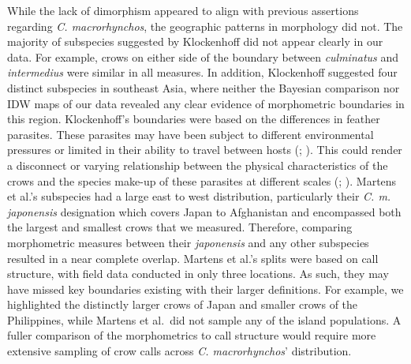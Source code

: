 \documentclass[10pt,a4paper]{article}
\begin{document}
While the lack of dimorphism appeared to align with previous assertions regarding \emph{C. macrorhynchos}, the geographic patterns in morphology did not.
The majority of subspecies suggested by Klockenhoff did not appear clearly in our data.
For example, crows on either side of the boundary between \emph{culminatus} and \emph{intermedius} were similar in all measures.
In addition, Klockenhoff suggested four distinct subspecies in southeast Asia, where neither the Bayesian comparison nor IDW maps of our data revealed any clear evidence of morphometric boundaries in this region.
Klockenhoff's boundaries were based on the differences in feather parasites.
These parasites may have been subject to different environmental pressures or limited in their ability to travel between hosts (; ).
This could render a disconnect or varying relationship between the physical characteristics of the crows and the species make-up of these parasites at different scales (; ).
Martens et al.'s subspecies had a large east to west distribution, particularly their \emph{C. m. japonensis} designation which covers Japan to Afghanistan and encompassed both the largest and smallest crows that we measured.
Therefore, comparing morphometric measures between their \emph{japonensis} and any other subspecies resulted in a near complete overlap.
Martens et al.'s splits were based on call structure, with field data conducted in only three locations.
As such, they may have missed key boundaries existing with their larger definitions.
For example, we highlighted the distinctly larger crows of Japan and smaller crows of the Philippines, while Martens et al.~did not sample any of the island populations.
A fuller comparison of the morphometrics to call structure would require more extensive sampling of crow calls across \emph{C. macrorhynchos}' distribution.
\end{document}
